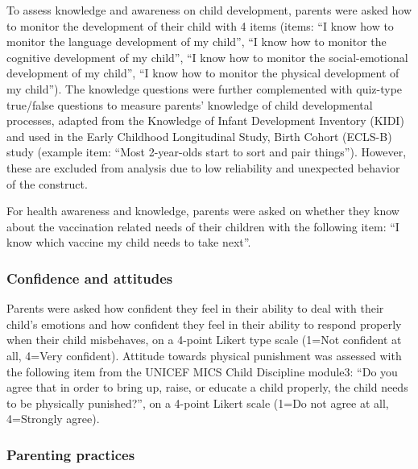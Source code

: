 To assess knowledge and awareness on child development, parents were asked how to monitor the development of their child with 4 items (items: “I know how to monitor the language development of my child”, “I know how to monitor the cognitive development of my child”, “I know how to monitor the social-emotional development of my child”, “I know how to monitor the physical development of my child”). The knowledge questions were further complemented with quiz-type true/false questions to measure parents’ knowledge of child developmental processes, adapted from the Knowledge of Infant Development Inventory (KIDI) and used in the Early Childhood Longitudinal Study, Birth Cohort (ECLS-B) study (example item: “Most 2-year-olds start to sort and pair things”).  However, these are excluded from analysis due to low reliability and unexpected behavior of the construct.

For health awareness and knowledge, parents were asked on whether they know about the vaccination related needs of their children with the following item: “I know which vaccine my child needs to take next”.

\subsubsection*{Confidence and attitudes}
Parents were asked how confident they feel in their ability to deal with their child’s emotions and how confident they feel in their ability to respond properly when their child misbehaves, on a 4-point Likert type scale (1=Not confident at all, 4=Very confident).
Attitude towards physical punishment was assessed with the following item from the UNICEF MICS Child Discipline module3: “Do you agree that in order to bring up, raise, or educate a child properly, the child needs to be physically punished?”, on a 4-point Likert scale (1=Do not agree at all, 4=Strongly agree).

\subsubsection*{Parenting practices}


